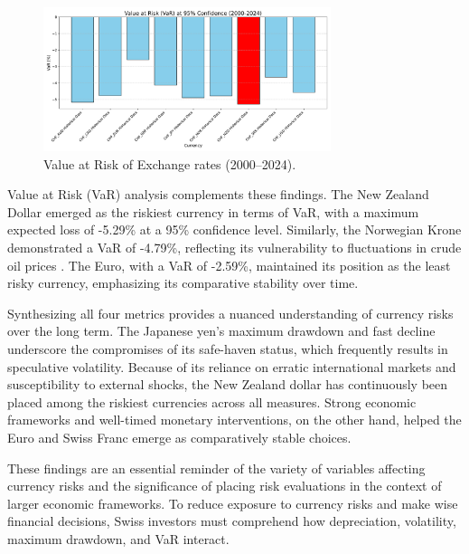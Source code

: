 \documentclass[11pt,a4paper,english,oneside]{book}
\begin{document}
\begin{figure}[h!]
    \centering
    \includegraphics[width=0.75\textwidth]{images/var_2000_2024.pdf}
    \caption{Value at Risk of Exchange rates (2000--2024).}
    \label{fig:var_2000_2024}
\end{figure}

Value at Risk (VaR) analysis complements these findings. The New Zealand Dollar emerged as the riskiest currency in terms of VaR, with a maximum expected loss of -5.29\% at a 95\% confidence level. Similarly, the Norwegian Krone demonstrated a VaR of -4.79\%, reflecting its vulnerability to fluctuations in crude oil prices \parencite{bergholt2016business}. The Euro, with a VaR of -2.59\%, maintained its position as the least risky currency, emphasizing its comparative stability over time.

Synthesizing all four metrics provides a nuanced understanding of currency risks over the long term. The Japanese yen's maximum drawdown and fast decline underscore the compromises of its safe-haven status, which frequently results in speculative volatility. Because of its reliance on erratic international markets and susceptibility to external shocks, the New Zealand dollar has continuously been placed among the riskiest currencies across all measures. Strong economic frameworks and well-timed monetary interventions, on the other hand, helped the Euro and Swiss Franc emerge as comparatively stable choices.

These findings are an essential reminder of the variety of variables affecting currency risks and the significance of placing risk evaluations in the context of larger economic frameworks. To reduce exposure to currency risks and make wise financial decisions, Swiss investors must comprehend how depreciation, volatility, maximum drawdown, and VaR interact.
\end{document}
